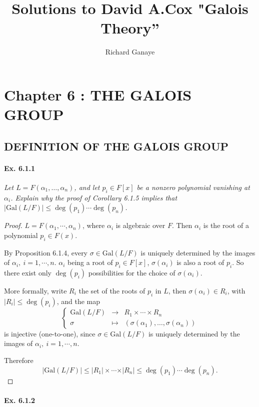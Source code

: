 \documentclass[11pt,a4paper]{article}
\title{Solutions to David A.Cox  "Galois Theory''}
\author{Richard Ganaye}
\newcommand{\Gal}{\mathrm{Gal}}
\begin{document}
\maketitle

\section{Chapter 6 : THE GALOIS GROUP}

\subsection{DEFINITION OF THE GALOIS GROUP}

\paragraph{Ex. 6.1.1}

{\it Let $L = F(\alpha_1,\ldots,\alpha_n)$, and let $p_i \in F[x]$ be a nonzero polynomial vanishing at $\alpha_i$. Explain why the proof of Corollary 6.1.5 implies that $|\Gal(L/F)| \leq \deg(p_1)\cdots\deg(p_n)$.
}

\begin{proof}
$L=F(\alpha_1,\cdots,\alpha_n)$, where $\alpha_i$ is algebraic over $F$. Then $\alpha_i$ is the root of a polynomial $p_i \in F(x)$.

By Proposition 6.1.4, every $\sigma \in \mathrm{Gal}(L/F)$ is uniquely determined by the images of $\alpha_i,\  i=1,\cdots,n$. $\alpha_i$ being a root of $p_i \in F[x]$, $\sigma(\alpha_i)$ is also a root of $p_i$. So there exist only $\deg(p_i)$ possibilities for the choice of $\sigma(\alpha_i)$.

More formally, write $R_i$ the set of the roots of  $p_i$ in $L$, then $\sigma(\alpha_i) \in R_i$, with $\vert R_i \vert \leq \deg(p_i)$, and the map
$$
\left\{
\begin{array}{ccc}
 \mathrm{Gal}(L/F) & \to  &  R_1\times \cdots \times R_n\\
\sigma  & \mapsto  &   (\sigma(\alpha_1), \ldots,\sigma(\alpha_n))
\end{array}
\right.
$$
is injective (one-to-one), since $\sigma \in \mathrm{Gal}(L/F)$ is uniquely determined by the images of $\alpha_i,\ i=1,\cdots,n$.

Therefore $$\vert \mathrm{Gal}(L/F) \vert \leq \vert R_1 \vert \times \cdots  \times \vert R_n\vert \leq \deg(p_1)\cdots \deg(p_n). $$
\end{proof}

\paragraph{Ex. 6.1.2}
\end{document}
